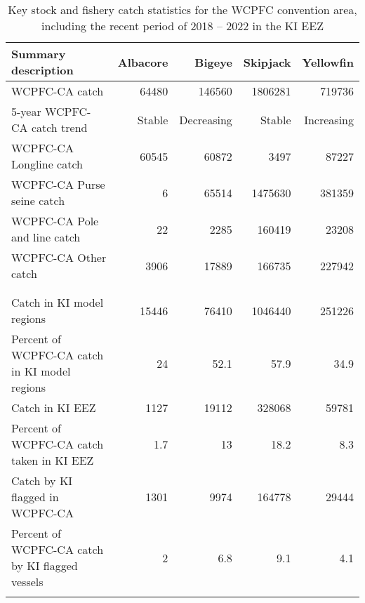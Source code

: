 \begin{longtable}{lrrrr}
\caption{Key stock and fishery catch statistics for the WCPFC convention area, including the recent period of 2018 -- 2022 in the KI EEZ} \\ 
  \hline
Summary description & Albacore & Bigeye & Skipjack & Yellowfin \\ 
  \hline
WCPFC-CA catch & 64480 & 146560 & 1806281 & 719736 \\ 
  5-year WCPFC-CA catch trend & Stable & Decreasing & Stable & Increasing \\ 
  WCPFC-CA Longline catch & 60545 & 60872 & 3497 & 87227 \\ 
  WCPFC-CA Purse seine catch & 6 & 65514 & 1475630 & 381359 \\ 
  WCPFC-CA Pole and line catch & 22 & 2285 & 160419 & 23208 \\ 
  WCPFC-CA Other catch & 3906 & 17889 & 166735 & 227942 \\ 
   &  &  &  &  \\ 
   \hline
 &  &  &  &  \\ 
  Catch in KI model regions & 15446 & 76410 & 1046440 & 251226 \\ 
  Percent of WCPFC-CA catch in KI model regions & 24 & 52.1 & 57.9 & 34.9 \\ 
  Catch in KI EEZ & 1127 & 19112 & 328068 & 59781 \\ 
  Percent of WCPFC-CA catch taken in KI EEZ & 1.7 & 13 & 18.2 & 8.3 \\ 
  Catch by KI flagged in WCPFC-CA & 1301 & 9974 & 164778 & 29444 \\ 
  Percent of WCPFC-CA catch by KI flagged vessels & 2 & 6.8 & 9.1 & 4.1 \\ 
  \hline
\label{cat_sum_tab}
\end{longtable}
